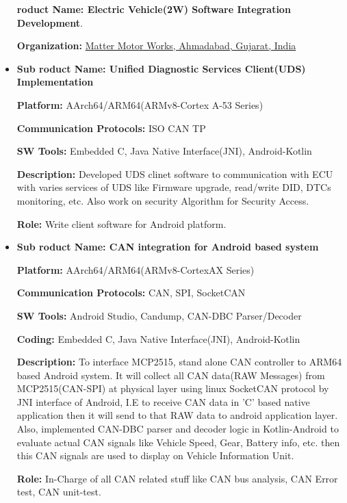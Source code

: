 \begin{itemize}
\vspace{2mm}
\hspace{-10mm}\textbf{\large {\faProductHunt}roduct Name: Electric Vehicle(2W) Software Integration Development}.\par \textbf{Organization:} \href{https://matter.in/}{Matter Motor Works, Ahmadabad, Gujarat, India}\par

    \item{\textbf{Sub {\faProductHunt}roduct Name: {Unified Diagnostic Services Client(UDS) Implementation}}}\par
    \textbf{Platform:} AArch64/ARM64(ARMv8-Cortex A-53 Series)\par
    \textbf{Communication Protocols:} ISO CAN TP\par
    \textbf{SW Tools:} Embedded C, Java Native Interface(JNI), Android-Kotlin\par
    \textbf{Description:} Developed UDS clinet software to communication with ECU with varies services of UDS like Firmware upgrade, read/write DID, DTCs monitoring, etc. Also work on security Algorithm for Security Access.\par
    \textbf{Role:} Write client software for Android platform.\par
    
    \item{\textbf{Sub {\faProductHunt}roduct Name: {CAN integration for Android based system}}}\par
    \textbf{Platform:} AArch64/ARM64(ARMv8-CortexAX Series)\par
    \textbf{Communication Protocols:} CAN, SPI, SocketCAN\par
    \textbf{SW Tools:} Android Studio, Candump, CAN-DBC Parser/Decoder\par
    \textbf{Coding:} Embedded C, Java Native Interface(JNI), Android-Kotlin \par
    \textbf{Description:} To interface MCP2515, stand alone CAN controller to ARM64 based Android system. It will collect all CAN data(RAW Messages) from MCP2515(CAN-SPI) at physical layer using linux SocketCAN protocol by JNI interface of Android, I.E to receive CAN data in 'C' based native application then it will send to that RAW data to android application layer.
    Also, implemented CAN-DBC parser and decoder logic in Kotlin-Android to evaluate actual CAN signals like Vehicle Speed, Gear, Battery info, etc. then this CAN signals are used to display on Vehicle Information Unit. \par
    \textbf{Role:} In-Charge of all CAN related stuff like CAN bus analysis, CAN Error test, CAN unit-test.\par
    

\end{itemize}
